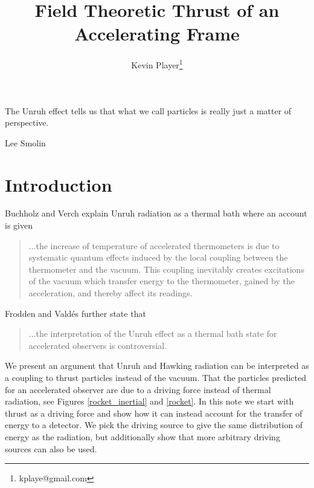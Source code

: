 \documentclass[12pt,a4paper]{article}
\begin{document}
\title{Field Theoretic Thrust of an Accelerating Frame}
\author[1]{Kevin Player\footnote{kplaye@gmail.com}}

\maketitle

\epigraph{The Unruh effect tells us that what we call particles is really just a matter of perspective.}{Lee Smolin}


\section{Introduction}
Buchholz and Verch \cite{Buchholz_2016} explain Unruh radiation as a thermal bath where an account is given

\begin{quote}
  ...the increase of temperature of accelerated thermometers is due to systematic quantum effects induced by the local coupling between the thermometer and the vacuum. This coupling inevitably creates excitations of the vacuum which transfer energy to the thermometer, gained by the acceleration, and thereby affect its readings.
\end{quote}
Frodden and Vald{\'{e}}s \cite{Frodden} further state that 
\begin{quote}
...the interpretation of the Unruh effect as a thermal bath state for accelerated observers is controversial.  
\end{quote}
We present an argument that Unruh and Hawking radiation can be interpreted as a coupling to thrust particles instead of the vacuum. That the particles predicted for an accelerated observer are due to a driving force instead of thermal radiation, see Figures \ref{rocket_inertial} and \ref{rocket}. In this note we start with thrust as a driving force and show how it can instead account for the transfer of energy to a detector.  We pick the driving source to give the same distribution of energy as the radiation, but additionally show that more arbitrary driving sources can also be used.
\end{document}
